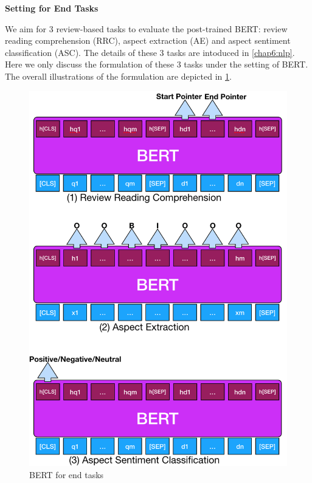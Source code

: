 \textbf{Setting for End Tasks}

We aim for 3 review-based tasks to evaluate the post-trained BERT: review reading comprehension (RRC), aspect extraction (AE) and aspect sentiment classification (ASC).
The details of these 3 tasks are intoduced in \ref{chap6:nlp}.
Here we only discuss the formulation of these 3 tasks under the setting of BERT.
The overall illustrations of the formulation are depicted in \ref{chap6:fig:overview}.

\begin{figure}
\centering
\includegraphics[width=5.in]{fig/naacl19_overview.png}
    \caption{BERT for end tasks}
\label{chap6:fig:overview}
\vspace{-3mm}
\end{figure}

